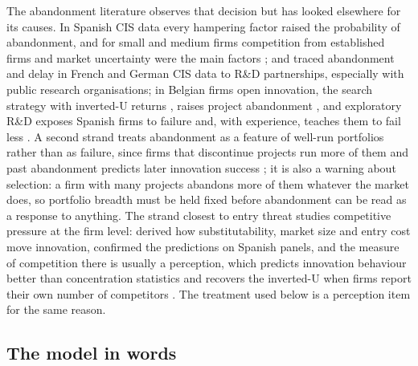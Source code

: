 \documentclass[preprint,12pt,authoryear]{elsarticle}
\begin{document}
The abandonment literature observes that decision but has looked elsewhere for its causes. In Spanish CIS data every hampering factor raised the probability of abandonment, and for small and medium firms competition from established firms and market uncertainty were the main factors \citep{garciavega2010determinants}; \citet{lhuillery2009rd} and \citet{vanbeers2017project} traced abandonment and delay in French and German CIS data to R\&D partnerships, especially with public research organisations; in Belgian firms open innovation, the search strategy with inverted-U returns \citep{laursen2006open}, raises project abandonment \citep{oi2026deficiency}, and exploratory R\&D exposes Spanish firms to failure and, with experience, teaches them to fail less \citep{deste2018exploring}. A second strand treats abandonment as a feature of well-run portfolios rather than as failure, since firms that discontinue projects run more of them \citep{klingebiel2021optionality} and past abandonment predicts later innovation success \citep{leoncini2016learning,love2023dynamics,cefis2024innovation}; it is also a warning about selection: a firm with many projects abandons more of them whatever the market does, so portfolio breadth must be held fixed before abandonment can be read as a response to anything. The strand closest to entry threat studies competitive pressure at the firm level: \citet{vives2008innovation} derived how substitutability, market size and entry cost move innovation, \citet{beneito2015competitive} confirmed the predictions on Spanish panels, and the measure of competition there is usually a perception, which predicts innovation behaviour better than concentration statistics \citep{tang2006competition} and recovers the inverted-U when firms report their own number of competitors \citep{friesenbichler2016innovation,crowley2017competition}. The treatment used below is a perception item for the same reason.

\subsection{The model in words}
\end{document}
